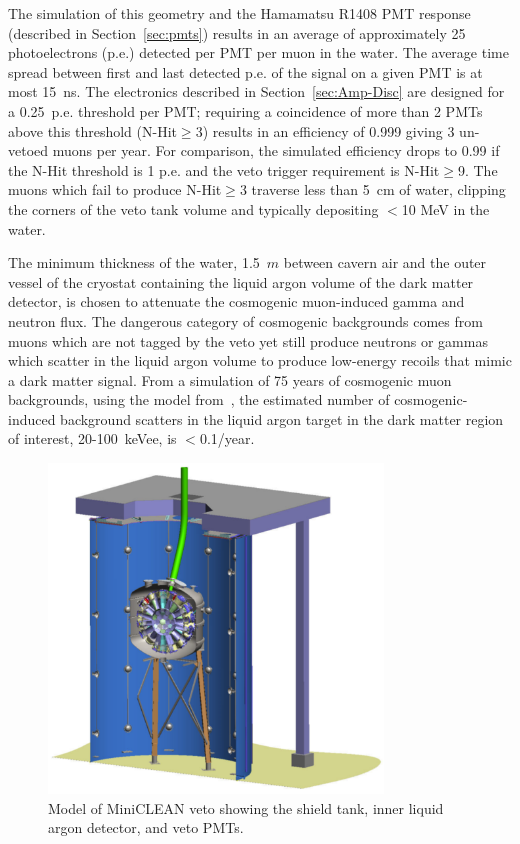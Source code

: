 \documentclass[review,number,sort&compress]{elsarticle}
\begin{document}
The simulation of this geometry and the Hamamatsu R1408 PMT response
(described in Section~\ref{sec:pmts}) results in an average of
approximately 25 photoelectrons (p.e.) detected per PMT per muon in
the water. The average time spread between first and last detected
p.e. of the signal on a given PMT is at most 15~ns. The electronics
described in Section~\ref{sec:Amp-Disc} are designed for a 0.25~p.e.
threshold per PMT; requiring a coincidence of more than 2 PMTs above
this threshold (N-Hit$\ge$3) results in an efficiency of 0.999 giving
3 un-vetoed muons per year. For comparison, the simulated efficiency
drops to 0.99 if the N-Hit threshold is 1 p.e. and the veto trigger
requirement is N-Hit$\ge$9. The muons which fail to produce N-Hit$\ge$3
traverse less than 5~cm of water, clipping the corners of the veto
tank volume and typically depositing $<$10 MeV in the water. 

The minimum thickness of the water, 1.5~$m$ between cavern air and the
outer vessel of the cryostat containing the liquid argon volume of the
dark matter detector, is chosen to attenuate the cosmogenic
muon-induced gamma and neutron flux.  The dangerous category of
cosmogenic backgrounds comes from muons which are not tagged by the
veto yet still produce neutrons or gammas which scatter in the liquid
argon volume to produce low-energy recoils that mimic a dark matter
signal.  From a simulation of 75 years of cosmogenic muon backgrounds,
using the model from~\cite{ref:mei_and_hime}, the estimated number of
cosmogenic-induced background scatters in the liquid argon target in
the dark matter region of interest, 20-100~keVee, is $<$0.1/year.

\begin{figure}[ht]
\begin{center}
\includegraphics[width=3.5in]{graphics/miniclean_overview_drawing.pdf}
\caption{Model of MiniCLEAN veto showing the shield tank, inner liquid argon detector, and veto PMTs.
\label{fig:veto_geom}}
\end{center}
\end{figure}
\end{document}
